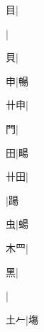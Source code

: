 \begin{multicols}{2}
{{\cjk{}{\cnsym{}　}{\cnsym{}　}目}|{}\par
{}|{}\par
{\cjk{}{\cnsym{}　}{\cnsym{}　}貝}|{}\par
{\cjk{}{\cnsym{}　}{\cnsym{}　}申}|{\cjk{}暢}\par
{\cjk{}{\cnsym{}　}卄申}|{}\par
{\cjk{}{\cnsym{}　}{\cnsym{}　}門}|{}\par
{\cjk{}{\cnsym{}　}{\cnsym{}　}田}|{\cjk{}畼}\par
{\cjk{}{\cnsym{}　}卄田}|{}\par
{}|{\cjk{}踼}\par
{\cjk{}{\cnsym{}　}{\cnsym{}　}虫}|{\cjk{}蝪}\par
{\cjk{}{\cnsym{}　}木{\cnxHanaA{}罒}}|{}\par
{\cjk{}{\cnsym{}　}{\cnsym{}　}黑}|{}\par
{}|{}\par
{\cjk{}{\cnsym{}　}土{\cnxHanaA{}𠂉}}|{\cjk{}塲}\par
}
\end{multicols}
